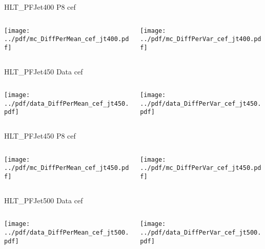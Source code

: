 \documentclass[9pt]{beamer}
\begin{document}
\begin{frame}[t]{HLT\_PFJet400 P8 cef}
\begin{columns}[T]
  \begin{column}{.5\textwidth}
  \texttt{[image: ../pdf/mc\_DiffPerMean\_cef\_jt400.pdf]}
  \end{column}
  \begin{column}{.5\textwidth}
  \texttt{[image: ../pdf/mc\_DiffPerVar\_cef\_jt400.pdf]}
  \end{column}
\end{columns}
\end{frame}

\begin{frame}[t]{HLT\_PFJet450 Data cef}
\begin{columns}[T]
  \begin{column}{.5\textwidth}
  \texttt{[image: ../pdf/data\_DiffPerMean\_cef\_jt450.pdf]}
  \end{column}
  \begin{column}{.5\textwidth}
  \texttt{[image: ../pdf/data\_DiffPerVar\_cef\_jt450.pdf]}
  \end{column}
\end{columns}
\end{frame}

\begin{frame}[t]{HLT\_PFJet450 P8 cef}
\begin{columns}[T]
  \begin{column}{.5\textwidth}
  \texttt{[image: ../pdf/mc\_DiffPerMean\_cef\_jt450.pdf]}
  \end{column}
  \begin{column}{.5\textwidth}
  \texttt{[image: ../pdf/mc\_DiffPerVar\_cef\_jt450.pdf]}
  \end{column}
\end{columns}
\end{frame}

\begin{frame}[t]{HLT\_PFJet500 Data cef}
\begin{columns}[T]
  \begin{column}{.5\textwidth}
  \texttt{[image: ../pdf/data\_DiffPerMean\_cef\_jt500.pdf]}
  \end{column}
  \begin{column}{.5\textwidth}
  \texttt{[image: ../pdf/data\_DiffPerVar\_cef\_jt500.pdf]}
  \end{column}
\end{columns}
\end{frame}
\end{document}
